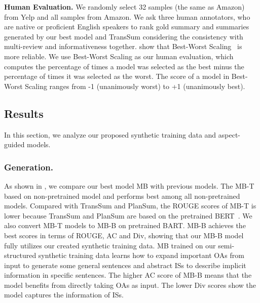 \textbf{Human Evaluation.}
We randomly select 32 samples (the same as Amazon) from Yelp and all samples from Amazon.
We ask three 
human annotators,
who are native or proficient English speakers to 
rank gold summary and summaries 
generated by our best model and TransSum considering the consistency with multi-review and informativeness together.
\citet{bestworst16} show that Best-Worst Scaling~\cite{bestworst} is more reliable.
We use Best-Worst Scaling as our human evaluation, which computes the percentage of times a model was selected as the best minus the percentage of times it was selected as the worst.
The score of a model in Best-Worst Scaling ranges from -1 (unanimously worst) to +1 (unanimously best). 



\subsection{Results}
\label{sec:results}
In this section, we analyze our proposed synthetic training data  and 
aspect-guided models.

\subsubsection{Generation.}
As shown in , we compare our best model MB with previous models.
The MB-T based on non-pretrained model and performs best among all non-pretrained models.
Compared with TransSum and PlanSum, the ROUGE scores of MB-T is lower
because TransSum and PlanSum are based on the pretrained BERT~\cite{BERT19}.
We also convert MB-T models to MB-B on pretrained BART.
MB-B achieves the best scores in terms of ROUGE, AC and Div,
showing that our MB-B model 
fully utilizes our created synthetic training data.
MB trained on our semi-structured synthetic training data
learns how to expand important OAs from input to generate some general
sentences and abstract ISs to describe implicit information 
in specific sentences.
The higher AC score of MB-B means
that the model benefits from directly taking OAs as input.
The lower Div scores show the model captures the information of
ISs.

